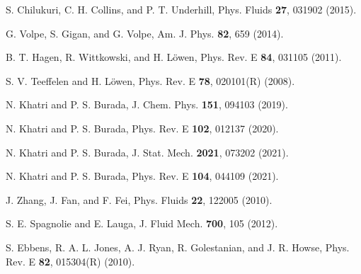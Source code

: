 \documentclass[aps,pre,preprint,superscriptaddress,amsmath,amssymb,nofootinbib]{revtex4}
\begin{document}
\begin{thebibliography}{100}
{S. Chilukuri, C. H. Collins, and P. T. Underhill}, {Phys. Fluids} {\bf 27}, {031902} {(2015)}.

{G. Volpe, S. Gigan, and G. Volpe}, {Am. J. Phys.} {\bf 82}, {659} {(2014)}.

{B. T. Hagen, R. Wittkowski, and H. L\"owen}, {Phys. Rev. E} {\bf 84}, {031105} {(2011)}.

{S. V. Teeffelen and H. L\"owen}, {Phys. Rev. E} {\bf 78}, {020101(R)} {(2008)}.

{N. Khatri and P. S. Burada}, {J. Chem. Phys.} {\bf 151}, {094103} {(2019)}.

{N. Khatri and P. S. Burada}, {Phys. Rev. E} {\bf 102}, {012137} {(2020)}. 

{N. Khatri and P. S. Burada}, {J. Stat. Mech.} {\bf 2021}, {073202} {(2021)}.

{N. Khatri and P. S. Burada}, {Phys. Rev. E} {\bf 104}, {044109} {(2021)}. 

{J. Zhang, J. Fan, and F. Fei}, {Phys. Fluids} {\bf 22}, {122005} {(2010)}. 

{S. E. Spagnolie and E. Lauga}, {J. Fluid Mech.} {\bf 700}, {105} {(2012)}.


{S. Ebbens, R. A. L. Jones, A. J. Ryan, R. Golestanian, and J. R. Howse}, {Phys. Rev. E} {\bf 82}, {015304(R)} {(2010)}.
	
	

\end{thebibliography}
\end{document}
